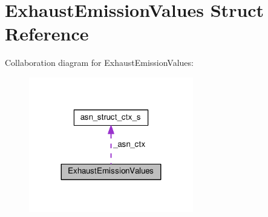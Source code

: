 \hypertarget{structExhaustEmissionValues}{}\section{Exhaust\+Emission\+Values Struct Reference}
\label{structExhaustEmissionValues}


Collaboration diagram for Exhaust\+Emission\+Values\+:\nopagebreak
\begin{figure}[H]
\begin{center}
\leavevmode
\includegraphics[width=203pt]{structExhaustEmissionValues__coll__graph}
\end{center}
\end{figure}
